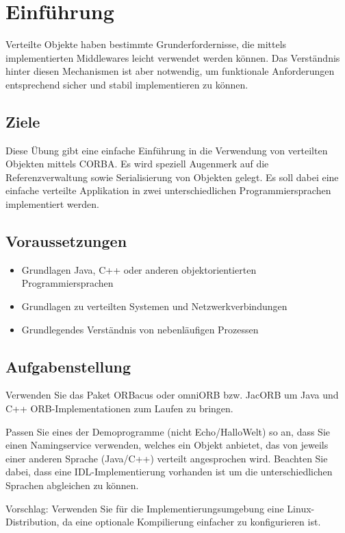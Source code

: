 
\section{Einführung}

Verteilte Objekte haben bestimmte Grunderfordernisse, die mittels implementierten Middlewares leicht verwendet werden können. Das Verständnis hinter diesen Mechanismen ist aber notwendig, um funktionale Anforderungen entsprechend sicher und stabil implementieren zu können.

\subsection{Ziele}

Diese Übung gibt eine einfache Einführung in die Verwendung von verteilten Objekten mittels CORBA. Es wird speziell Augenmerk auf die Referenzverwaltung sowie Serialisierung von Objekten gelegt. Es soll dabei eine einfache verteilte Applikation in zwei unterschiedlichen Programmiersprachen implementiert werden.

\subsection{Voraussetzungen}

\begin{itemize}
	\item Grundlagen Java, C++ oder anderen objektorientierten Programmiersprachen
    \item Grundlagen zu verteilten Systemen und Netzwerkverbindungen
    \item Grundlegendes Verständnis von nebenläufigen Prozessen
\end{itemize}

\subsection{Aufgabenstellung}

Verwenden Sie das Paket ORBacus \cite{Orbacus} oder omniORB \cite{OmniORB} bzw. JacORB \cite{JacORB} um Java und C++ ORB-Implementationen zum Laufen zu bringen. \cite{OmniORB_guide} \cite{Orbacus_guide}

Passen Sie eines der Demoprogramme (nicht Echo/HalloWelt) so an, dass Sie einen Namingservice verwenden, welches ein Objekt anbietet, das von jeweils einer anderen Sprache (Java/C++) verteilt angesprochen wird. Beachten Sie dabei, dass eine IDL-Implementierung vorhanden ist um die unterschiedlichen Sprachen abgleichen zu können.

Vorschlag: Verwenden Sie für die Implementierungsumgebung eine Linux-Distribution, da eine optionale Kompilierung einfacher zu konfigurieren ist.

\clearpage
